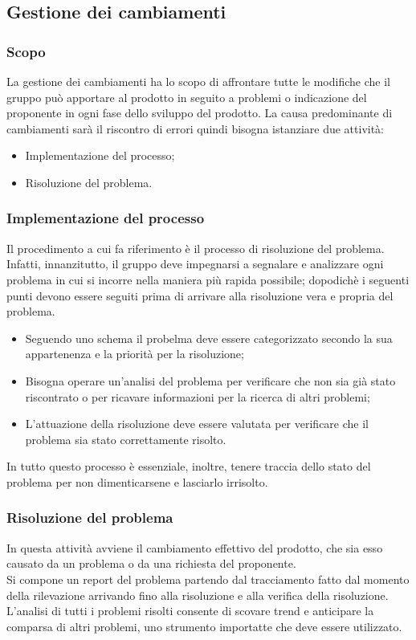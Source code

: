 \subsection{Gestione dei cambiamenti}
\subsubsection{Scopo}
La gestione dei cambiamenti ha lo scopo di affrontare tutte le modifiche che il gruppo può apportare al prodotto in seguito a problemi o indicazione del proponente in ogni fase dello sviluppo del prodotto.
La causa predominante di cambiamenti sarà il riscontro di errori quindi bisogna istanziare due attività: 
\begin{itemize}
    \item Implementazione del processo;
    \item Risoluzione del problema.
\end{itemize}
\subsubsection{Implementazione del processo}
Il procedimento a cui fa riferimento è il processo di risoluzione del problema.
Infatti, innanzitutto, il gruppo deve impegnarsi a segnalare e analizzare ogni problema in cui si incorre nella maniera più rapida possibile; dopodichè i seguenti punti devono essere seguiti prima di arrivare alla risoluzione vera e propria del problema.
\begin{itemize}
    \item Seguendo uno schema il probelma deve essere categorizzato secondo la sua appartenenza e la priorità per la risoluzione;
    \item Bisogna operare un'analisi del problema per verificare che non sia già stato riscontrato o per ricavare informazioni per la ricerca di altri problemi;
    \item L'attuazione della risoluzione deve essere valutata per verificare che il problema sia stato correttamente risolto.
\end{itemize}
In tutto questo processo è essenziale, inoltre, tenere traccia dello stato del problema per non dimenticarsene e lasciarlo irrisolto.

\subsubsection{Risoluzione del problema}
In questa attività avviene il cambiamento effettivo del prodotto, che sia esso causato da un problema o da una richiesta del proponente.\\
Si compone un report del problema partendo dal tracciamento fatto dal momento della rilevazione arrivando fino alla risoluzione e alla verifica della risoluzione.\\
L'analisi di tutti i problemi risolti consente di scovare trend e anticipare la comparsa di altri problemi, uno strumento importatte che deve essere utilizzato.
